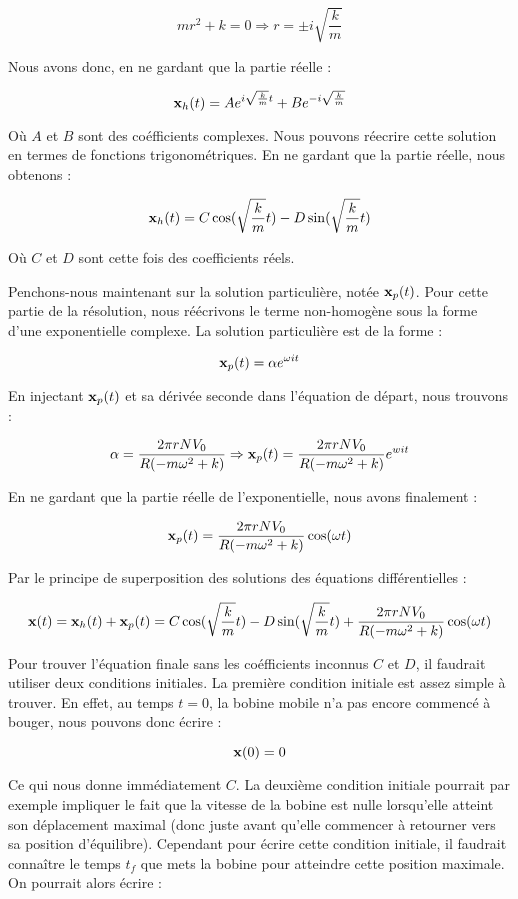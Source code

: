 $$mr^2 + k = 0 \Rightarrow r = \pm i\sqrt{\frac{k}{m}}$$

Nous avons donc, en ne gardant que la partie réelle :

$${\bf x}_h(t) = Ae^{i\sqrt{\frac{k}{m}}t} + Be^{-i\sqrt{\frac{k}{m}}}$$

Où $A$ et $B$ sont des coéfficients complexes. Nous pouvons réecrire cette solution
en termes de fonctions trigonométriques. En ne gardant que la partie réelle, 
nous obtenons :

$${\bf x}_h(t) = C\cos(\sqrt{\frac{k}{m}}t) - D\sin(\sqrt{\frac{k}{m}}t)$$

Où $C$ et $D$ sont cette fois des coefficients réels.

Penchons-nous maintenant sur la solution particulière, notée ${\bf x}_p(t)$. Pour
cette partie de la résolution, nous réécrivons le terme non-homogène sous la forme d'une
exponentielle complexe. La solution particulière est de la forme :

$${\bf x}_p(t) = \alpha e^{\omega it}$$

En injectant ${\bf x}_p(t)$ et sa dérivée seconde dans l'équation de départ, nous trouvons :

$$\alpha = \frac{2\pi rNV_0}{R(-m\omega^2 + k)} \Rightarrow {\bf x}_p(t) = \frac{2\pi rNV_0}{R(-m\omega^2 + k)}e^{wit}$$

En ne gardant que la partie réelle de l'exponentielle, nous avons finalement :

$${\bf x}_p(t) = \frac{2\pi rNV_0}{R(-m\omega^2 + k)} \cos (\omega t)$$

Par le principe de superposition des solutions des équations différentielles :

$${\bf x}(t) = {\bf x}_h(t) + {\bf x}_p(t) = C\cos(\sqrt{\frac{k}{m}}t) - D\sin(\sqrt{\frac{k}{m}}t) + \frac{2\pi rNV_0}{R(-m\omega^2 + k)} \cos (\omega t)$$

Pour trouver l'équation finale sans les coéfficients inconnus $C$ et $D$, il faudrait utiliser deux conditions
initiales. La première condition initiale est assez simple à trouver. En effet, au temps $t=0$, la bobine
mobile n'a pas encore commencé à bouger, nous pouvons donc écrire :

$${\bf x}(0) = 0$$

Ce qui nous donne immédiatement $C$. La deuxième condition initiale pourrait par exemple impliquer le fait
que la vitesse de la bobine est nulle lorsqu'elle atteint son déplacement maximal (donc juste avant qu'elle 
commencer à retourner vers sa position d'équilibre). Cependant pour écrire cette condition initiale, il faudrait
connaître le temps $t_f$ que mets la bobine pour atteindre cette position maximale. On pourrait alors écrire :

